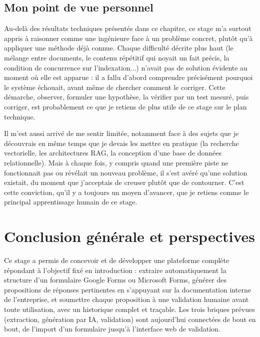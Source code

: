 \documentclass[12pt,a4paper]{report}
\begin{document}
\section{Mon point de vue personnel}

Au-delà des résultats techniques présentés dans ce chapitre, ce stage
m'a surtout appris à raisonner comme une ingénieure face à un problème
concret, plutôt qu'à appliquer une méthode déjà connue. Chaque
difficulté décrite plus haut (le mélange entre documents, le contenu
répétitif qui noyait un fait précis, la condition de concurrence sur
l'indexation...) n'avait pas de solution évidente au moment où elle est
apparue : il a fallu d'abord comprendre précisément pourquoi le système
échouait, avant même de chercher comment le corriger. Cette démarche,
observer, formuler une hypothèse, la vérifier par un test mesuré, puis
corriger, est probablement ce que je retiens de plus utile de ce stage
sur le plan technique.

Il m'est aussi arrivé de me sentir limitée, notamment face à des sujets
que je découvrais en même temps que je devais les mettre en pratique
(la recherche vectorielle, les architectures RAG, la conception d'une
base de données relationnelle). Mais à chaque fois, y compris quand une
première piste ne fonctionnait pas ou révélait un nouveau problème, il
s'est avéré qu'une solution existait, du moment que j'acceptais de
creuser plutôt que de contourner. C'est cette conviction, qu'il y a
toujours un moyen d'avancer, que je retiens comme le principal
apprentissage humain de ce stage.

\chapter*{Conclusion générale et perspectives}

Ce stage a permis de concevoir et de développer une plateforme complète
répondant à l'objectif fixé en introduction : extraire automatiquement
la structure d'un formulaire Google Forms ou Microsoft Forms, générer
des propositions de réponses pertinentes en s'appuyant sur la
documentation interne de l'entreprise, et soumettre chaque proposition
à une validation humaine avant toute utilisation, avec un historique
complet et traçable. Les trois briques prévues (extraction, génération
par IA, validation) sont aujourd'hui connectées de bout en bout, de
l'import d'un formulaire jusqu'à l'interface web de validation.
\end{document}
